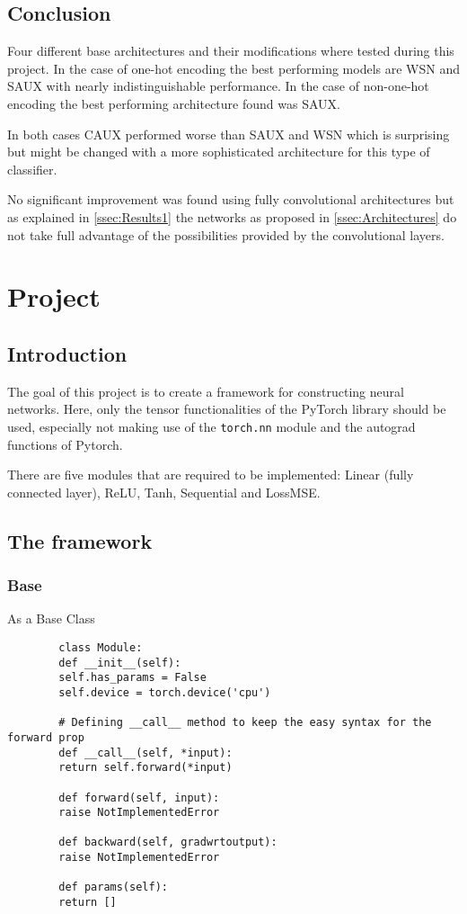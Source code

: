 \documentclass[11pt,english]{article}
\begin{document}
	\subsection{Conclusion}
	Four different base architectures and their modifications where tested during this project. In the case of one-hot encoding the best performing models are WSN and SAUX with nearly indistinguishable performance. In the case of non-one-hot encoding the best performing architecture found was SAUX. 
	
	In both cases CAUX performed worse than SAUX and WSN which is surprising but might be changed with a more sophisticated architecture for this type of classifier.
	
	No significant improvement was found using fully convolutional architectures but as explained in \cref{ssec:Results1} the networks as proposed in \cref{ssec:Architectures} do not take full advantage of the possibilities provided by the convolutional layers.

	\section{Project} \label{sec:Proj2}
	\vspace{-10pt}
	
	\subsection{Introduction}
	The goal of this project is to create a framework for constructing neural networks. Here, only the tensor functionalities of the PyTorch library should be used, especially not making use of the \lstinline|torch.nn| module and the autograd functions of Pytorch.
	
	There are five modules that are required to be implemented: Linear (fully connected layer), ReLU, Tanh, Sequential and LossMSE.
	
	\subsection{The framework}
	
	\subsubsection{Base}
	
	As a Base Class 
	
	\begin{lstlisting}
		class Module:
		def __init__(self):
		self.has_params = False
		self.device = torch.device('cpu')
		
		# Defining __call__ method to keep the easy syntax for the forward prop
		def __call__(self, *input):
		return self.forward(*input)
		
		def forward(self, input):
		raise NotImplementedError
		
		def backward(self, gradwrtoutput):
		raise NotImplementedError
		
		def params(self):
		return []
	\end{lstlisting}
	
\end{document}
